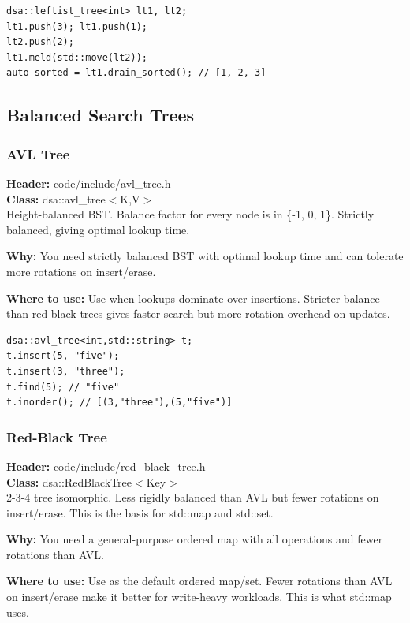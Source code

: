 \documentclass[11pt]{article}
\begin{document}
\begin{lstlisting}
dsa::leftist_tree<int> lt1, lt2;
lt1.push(3); lt1.push(1);
lt2.push(2);
lt1.meld(std::move(lt2));
auto sorted = lt1.drain_sorted(); // [1, 2, 3]
\end{lstlisting}

\subsection{Balanced Search Trees}

\subsubsection{AVL Tree}
\textbf{Header:} code/include/avl\_tree.h\\
\textbf{Class:} dsa::avl\_tree$<$K,V$>$\\

Height-balanced BST. Balance factor for every node is in \{-1, 0, 1\}. Strictly balanced, giving optimal lookup time.

\textbf{Why:} You need strictly balanced BST with optimal lookup time and can tolerate more rotations on insert/erase. \par \textbf{Where to use:} Use when lookups dominate over insertions. Stricter balance than red-black trees gives faster search but more rotation overhead on updates.

\begin{lstlisting}
dsa::avl_tree<int,std::string> t;
t.insert(5, "five");
t.insert(3, "three");
t.find(5); // "five"
t.inorder(); // [(3,"three"),(5,"five")]
\end{lstlisting}

\subsubsection{Red-Black Tree}
\textbf{Header:} code/include/red\_black\_tree.h\\
\textbf{Class:} dsa::RedBlackTree$<$Key$>$\\

2-3-4 tree isomorphic. Less rigidly balanced than AVL but fewer rotations on insert/erase. This is the basis for std::map and std::set.

\textbf{Why:} You need a general-purpose ordered map with all operations and fewer rotations than AVL. \par \textbf{Where to use:} Use as the default ordered map/set. Fewer rotations than AVL on insert/erase make it better for write-heavy workloads. This is what std::map uses.
\end{document}
